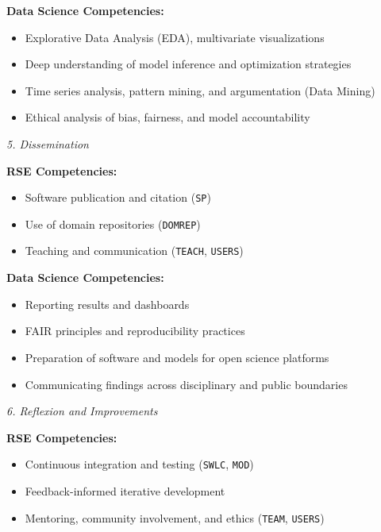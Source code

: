 \documentclass[
        english,biblatex
    ]{lni}
\providecommand{\tightlist}{%
    \setlength{\itemsep}{0pt}\setlength{\parskip}{0pt}}
\begin{document}
    \textbf{Data Science Competencies:}

    \begin{itemize}
    \tightlist
    \item
      Explorative Data Analysis (EDA), multivariate visualizations
    \item
      Deep understanding of model inference and optimization strategies
    \item
      Time series analysis, pattern mining, and argumentation (Data
      Mining)
    \item
      Ethical analysis of bias, fairness, and model accountability
    \end{itemize}

    \emph{5. Dissemination}

    \textbf{RSE Competencies:}

    \begin{itemize}
    \tightlist
    \item
      Software publication and citation (\texttt{SP})
    \item
      Use of domain repositories (\texttt{DOMREP})
    \item
      Teaching and communication (\texttt{TEACH}, \texttt{USERS})
    \end{itemize}

    \textbf{Data Science Competencies:}

    \begin{itemize}
    \tightlist
    \item
      Reporting results and dashboards
    \item
      FAIR principles and reproducibility practices
    \item
      Preparation of software and models for open science platforms
    \item
      Communicating findings across disciplinary and public boundaries
    \end{itemize}

    \emph{6. Reflexion and Improvements}

    \textbf{RSE Competencies:}

    \begin{itemize}
    \tightlist
    \item
      Continuous integration and testing (\texttt{SWLC}, \texttt{MOD})
    \item
      Feedback-informed iterative development
    \item
      Mentoring, community involvement, and ethics (\texttt{TEAM},
      \texttt{USERS})
    \end{itemize}
\end{document}
